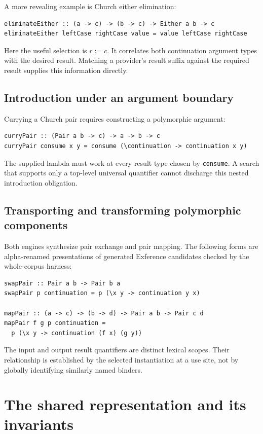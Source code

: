 \documentclass[11pt]{article}
\newcommand{\code}[1]{\texttt{#1}}
\begin{document}
A more revealing example is Church either elimination:
\begin{lstlisting}
eliminateEither :: (a -> c) -> (b -> c) -> Either a b -> c
eliminateEither leftCase rightCase value = value leftCase rightCase
\end{lstlisting}
Here the useful selection is $r := c$. It correlates both continuation
argument types with the desired result. Matching a provider's result suffix
against the required result supplies this information directly.

\subsection{Introduction under an argument boundary}

Currying a Church pair requires constructing a polymorphic argument:
\begin{lstlisting}
curryPair :: (Pair a b -> c) -> a -> b -> c
curryPair consume x y = consume (\continuation -> continuation x y)
\end{lstlisting}
The supplied lambda must work at every result type chosen by
\code{consume}. A search that supports only a top-level universal quantifier
cannot discharge this nested introduction obligation.

\subsection{Transporting and transforming polymorphic components}

Both engines synthesize pair exchange and pair mapping. The following forms
are alpha-renamed presentations of generated Exference candidates checked by
the whole-corpus harness:
\begin{lstlisting}
swapPair :: Pair a b -> Pair b a
swapPair p continuation = p (\x y -> continuation y x)

mapPair :: (a -> c) -> (b -> d) -> Pair a b -> Pair c d
mapPair f g p continuation =
  p (\x y -> continuation (f x) (g y))
\end{lstlisting}
The input and output result quantifiers are distinct lexical scopes. Their
relationship is established by the selected instantiation at a use site, not
by globally identifying similarly named binders.

\section{The shared representation and its invariants}
\end{document}
